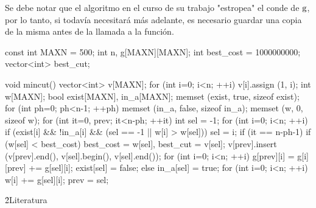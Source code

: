 Se debe notar que el algoritmo en el curso de su trabajo "estropea" el conde de $\rm g$, por lo tanto, si todavía necesitará más adelante, es necesario guardar una copia de la misma antes de la llamada a la función.

\code
const int MAXN = 500;
int n, g[MAXN][MAXN];
int best_cost = 1000000000;
vector<int> best_cut;

void mincut() {
vector<int> v[MAXN];
for (int i=0; i<n; ++i)
v[i].assign (1, i);
int w[MAXN];
bool exist[MAXN], in_a[MAXN];
memset (exist, true, sizeof exist);
for (int ph=0; ph<n-1; ++ph) {
memset (in_a, false, sizeof in_a);
memset (w, 0, sizeof w);
for (int it=0, prev; it<n-ph; ++it) {
int sel = -1;
for (int i=0; i<n; ++i)
if (exist[i] && !in_a[i] && (sel == -1 || w[i] > w[sel]))
sel = i;
if (it == n-ph-1) {
if (w[sel] < best_cost)
best_cost = w[sel], best_cut = v[sel];
v[prev].insert (v[prev].end(), v[sel].begin(), v[sel].end());
for (int i=0; i<n; ++i)
g[prev][i] = g[i][prev] += g[sel][i];
exist[sel] = false;
}
else {
in_a[sel] = true;
for (int i=0; i<n; ++i)
w[i] += g[sel][i];
prev = sel;
}
}
}
}
\endcode


\h2{Literatura}

\ul{
\li {}
\li {}
}